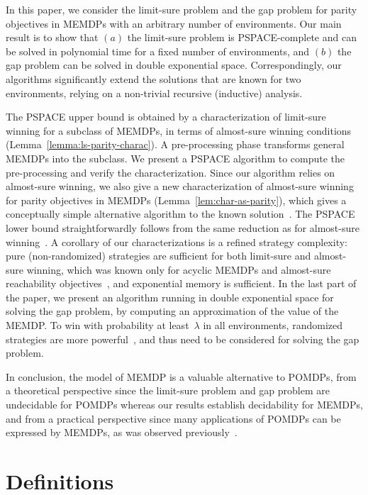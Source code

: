 \documentclass[a4paper,USenglish,cleveref, autoref, thm-restate]{lipics-v2021}
\begin{document}
In this paper, we consider the limit-sure problem and the gap problem 
for parity objectives in MEMDPs with an arbitrary number of environments.
Our main result is to show that $(a)$ the limit-sure problem is PSPACE-complete and can be solved in polynomial time for a fixed number of environments, 
and $(b)$ the gap problem can be solved in double exponential space.
Correspondingly,
our algorithms significantly extend the solutions that are known for two environments, relying on a non-trivial recursive (inductive) analysis.



The PSPACE upper bound is obtained by a characterization
of limit-sure winning for a subclass of MEMDPs, in terms of almost-sure 
winning conditions (Lemma~\ref{lemma:ls-parity-charac}). A pre-processing phase transforms general MEMDPs into
the subclass. We present a PSPACE algorithm to compute the pre-processing and
verify the characterization. 
Since our algorithm relies on almost-sure winning, we also give a new characterization 
of almost-sure winning for parity objectives in MEMDPs (Lemma~\ref{lem:char-as-parity}), 
which gives a conceptually simple alternative algorithm to the known solution~\cite{SVJ24}.
The PSPACE lower bound straightforwardly follows from the same reduction as for 
almost-sure winning~\cite[Theorem~7]{SVJ24}.
A corollary of our characterizations is a refined strategy complexity: pure (non-randomized) strategies 
are sufficient for both limit-sure and almost-sure winning, which was known 
only for acyclic MEMDPs and almost-sure reachability objectives~\cite[Lemma~12]{vdVJJ23},
and exponential memory is sufficient.
In the last part of the paper, we present an algorithm running in double exponential space
for solving the gap problem, by computing an approximation of the value of the MEMDP.
To win with probability at least~$\lambda$ in all environments, 
randomized strategies are more powerful~\cite[Lemma~3]{RS14}, and thus need 
to be considered for solving the gap problem.


In conclusion, 
the model of MEMDP is a valuable alternative to POMDPs, from a theoretical
perspective since the limit-sure problem and gap problem are undecidable 
for POMDPs  whereas our results establish decidability for MEMDPs, and from a practical perspective since
many applications of POMDPs can be expressed by MEMDPs, as was observed previously~\cite{BSSJ23,vdVJJ23}.


\section{Definitions}
\end{document}

